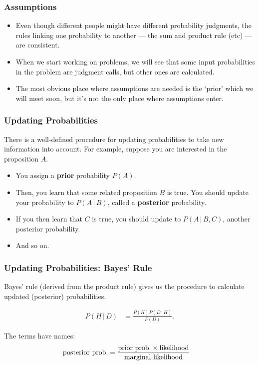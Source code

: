 \documentclass{beamer}
\newcommand{\given}{\,|\,}
\begin{document}
\begin{frame}
\frametitle{Assumptions}
\begin{itemize}
\item Even though different people might have different probability
judgments, the rules linking one probability to another --- the sum
and product rule (etc) --- are consistent.\\\pause
\item When we start working on problems, we will see that some
input probabilities in the problem
are judgment calls, but other ones are calculated.\\\pause
\item The most obvious place where assumptions are needed is the
`prior' which we will meet soon, but it's not the only place
where assumptions enter.
\end{itemize}

\end{frame}


\begin{frame}
\frametitle{Updating Probabilities}
There is a well-defined procedure for updating probabilities to take new
information into account. For example, suppose you are interested in
the proposition $A$.\pause
\begin{itemize}
\item You assign a {\bf prior} probability $P(A)$.\pause
\item Then, you learn that
some related proposition $B$ is true. You should update your probability
to $P(A \given B)$, called a {\bf posterior} probability.\pause
\item If you then learn that $C$ is true, you should update
to $P(A \given B, C)$, another posterior probability.\pause
\item And so on.
\end{itemize}

\end{frame}



\begin{frame}
\frametitle{Updating Probabilities: Bayes' Rule}
Bayes' rule (derived from the product rule) gives us the procedure to
calculate updated (posterior) probabilities.

\begin{align}
P(H \given D) &= \frac{P(H) P(D\given H)}{P(D)}.
\end{align}

\pause
The terms have names:
\begin{align}
\textnormal{posterior prob.} &=
        \frac{\textnormal{prior prob.} \times \textnormal{likelihood}}{\textnormal{marginal likelihood}}
\end{align}

\end{frame}
\end{document}
